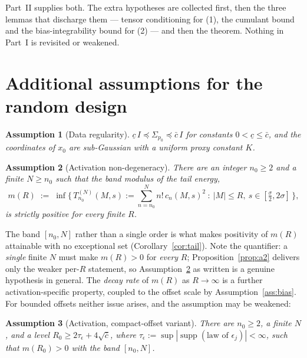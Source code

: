 \documentclass[11pt]{article}
\newtheorem{assumption}{Assumption}
\theoremstyle{remark}
\newcommand{\Sig}{\Sigma_{p_0}}
\begin{document}
\noindent Part~II supplies both. The extra hypotheses are collected first, then the three lemmas that discharge them --- tensor conditioning for (1), the cumulant bound and the bias-integrability bound for (2) --- and then the theorem. Nothing in Part~I is revisited or weakened.

\section{Additional assumptions for the random design}\label{sec:assumptions2}

\begin{assumption}[Data regularity]\label{ass:data}
$\underline c\, I \preceq \Sig \preceq \bar c\, I$ for constants $0 < \underline c \le \bar c$, and the coordinates of $x_0$ are sub-Gaussian with a uniform proxy constant $K$.
\end{assumption}

\begin{assumption}[Activation non-degeneracy]\label{ass:act}
There are an integer $n_0 \ge 2$ and a finite $N \ge n_0$ such that the \emph{band modulus} of the tail energy,
\begin{equation}\label{eq:nondeg}
m(R) \;:=\; \inf\Big\{\, T^{(N)}_{n_0}(M,s) := \textstyle\sum_{n=n_0}^{N} n!\,c_n(M,s)^2 \ :\ |M| \le R,\ s \in [\tfrac\sigma2, 2\sigma] \,\Big\},
\end{equation}
is strictly positive for every finite $R$.
\end{assumption}

\noindent The band $[n_0,N]$ rather than a single order is what makes positivity of $m(R)$ attainable with no exceptional set (Corollary~\ref{cor:tail}). Note the quantifier: a \emph{single} finite $N$ must make $m(R) > 0$ for \emph{every} $R$; Proposition~\ref{prop:a2} delivers only the weaker per-$R$ statement, so Assumption~\ref{ass:act} as written is a genuine hypothesis in general. The \emph{decay rate} of $m(R)$ as $R \to \infty$ is a further activation-specific property, coupled to the offset scale by Assumption~\ref{ass:bias}. For bounded offsets neither issue arises, and the assumption may be weakened:

\begin{assumption}[Activation, compact-offset variant]\label{ass:actprime}
There are $n_0 \ge 2$, a finite $N$, and a level $R_0 \ge 2\tau_\epsilon + 4\sqrt{\bar c}$, where $\tau_\epsilon := \sup|\operatorname{supp}(\text{law of }\epsilon_j)| < \infty$, such that $m(R_0) > 0$ with the band $[n_0, N]$.
\end{assumption}
\end{document}

